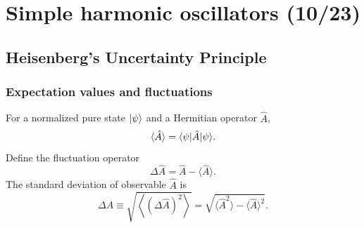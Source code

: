 \section{Simple harmonic oscillators (10/23)}


\subsection{Heisenberg's Uncertainty Principle}

\subsubsection{Expectation values and fluctuations}
For a normalized pure state $|{\psi}\rangle$ and a Hermitian operator $\hat A$,
\begin{equation}
 \langle\hat A\rangle=\langle{\psi}|\hat A|{\psi}\rangle.
\end{equation}
Define the fluctuation operator
\begin{equation}
 \Delta\hat A=\hat A-\langle\hat A\rangle.
\end{equation}
The standard deviation of observable $\hat A$ is
\begin{equation}
 \Delta A
\equiv\sqrt{\left\langle(\Delta\hat A)^2\right\rangle}
 =\sqrt{\langle\hat A^2\rangle-\langle\hat A\rangle^2}.
\end{equation}


